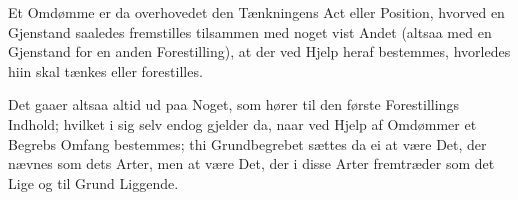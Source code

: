 \documentclass[12pt]{book}
\def\emph#1{#1}%
\begin{document}
Et \emph{Omdømme} er da overhovedet den Tænkningens \emph{Act} eller \emph{Position},
hvorved en Gjenstand saaledes fremstilles tilsammen med noget vist \emph{Andet} (altsaa
med en Gjenstand for en anden Forestilling), at der ved Hjelp heraf bestemmes,
hvorledes hiin skal tænkes eller forestilles.

Det gaaer altsaa altid ud paa Noget, som hører til den første Forestillings
\emph{Indhold}; hvilket i sig selv endog gjelder da, naar ved Hjelp af Omdømmer et
Begrebs \emph{Omfang} bestemmes; thi Grundbegrebet sættes da ei at være Det, der nævnes
som dets \emph{Arter}, men at være Det, der i disse \emph{Arter} fremtræder som det
\emph{Lige} og til Grund \emph{Liggende}.
\end{document}
